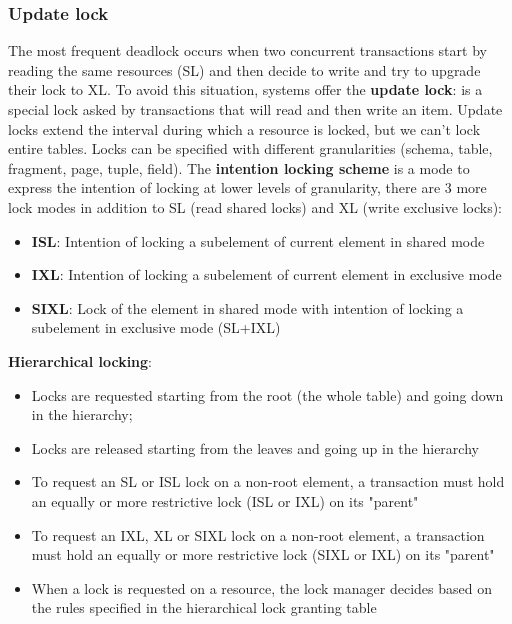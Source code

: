 \subsubsection{Update lock}
The most frequent deadlock occurs when two concurrent
transactions start by reading the same resources (SL) and
then decide to write and try to upgrade their lock to XL.\newline
\newline
To avoid this situation, systems offer the \textbf{update lock}: is a special lock asked by transactions that will read and then write an item.\newline
\newline
Update locks extend the interval during which a resource is locked, but we can't lock entire tables. Locks can be specified with different granularities (schema, table, fragment, page, tuple, field).\newline
\newline
The \textbf{intention locking scheme} is a mode to express the intention of locking at lower levels of granularity, there are 3 more lock modes in addition to SL (read shared locks) and XL (write exclusive locks):
\begin{itemize}
    \item \textbf{ISL}: Intention of locking a subelement of current element
    in shared mode
    \item \textbf{IXL}: Intention of locking a subelement of current
    element in exclusive mode
    \item \textbf{SIXL}: Lock of the element in shared mode with intention
    of locking a subelement in exclusive mode (SL+IXL)    
\end{itemize}
\textbf{Hierarchical locking}:
\begin{itemize}
    \item Locks are requested starting from the root (the whole table) and going down in the hierarchy;
    \item Locks are released starting from the leaves and going up
    in the hierarchy
    \item To request an SL or ISL lock on a non-root element, a
    transaction must hold an equally or more restrictive lock
    (ISL or IXL) on its "parent"
    \item  To request an IXL, XL or SIXL lock on a non-root element,
    a transaction must hold an equally or more restrictive lock
    (SIXL or IXL) on its "parent"
    \item When a lock is requested on a resource, the lock manager
    decides based on the rules specified in the hierarchical
    lock granting table 
\end{itemize}
